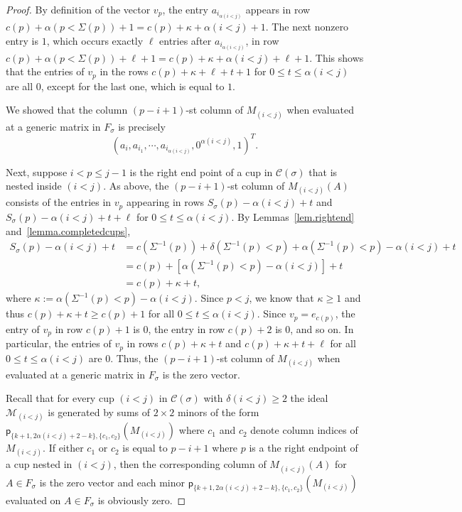 \documentclass[11pt]{amsart}
\theoremstyle{remark}
\theoremstyle{remark}
\theoremstyle{definition}
\theoremstyle{definition}
\theoremstyle{definition}
\numberwithin{equation}{section}
\newcommand{\ga}{\alpha}
\newcommand{\gd}{\delta}
\newcommand{\gs}{\sigma}
\newcommand{\cc}{\mathcal{C}}
\newcommand{\cm}{\mathcal{M}}
\newcommand{\al}{\alpha}
\newcommand{\pl}{\mathsf{p}}
\newcommand{\E}{\Sigma}
\newcommand{\cupsigma}{\cc(\gs)}
\newcommand{\cell}{F_\gs}
\begin{document}
\begin{proof}
By definition of the vector $v_p$, the entry $a_{i_{\ga(i<j)}}$ appears in row $c(p)+\alpha(p<\E(p))+1 = c(p)+\kappa+\ga(i<j)+1$. The next nonzero entry is $1$, which occurs exactly $\ell$ entries after $a_{i_{\ga(i<j)}}$, in row $c(p)+\alpha(p<\E(p))+\ell+1 = c(p)+\kappa+\ga(i<j)+\ell+1$.   This shows that the entries of $v_p$ in the rows $c(p)+\kappa + \ell +t +1$ for $0\leq t \leq \ga(i<j)$ are all $0$, except for the last one, which is equal to $1$. 
 

We showed that the column $(p-i+1)$-st column of $M_{(i<j)}$ when evaluated at a generic matrix in $\cell$ is precisely
\[
\left(a_{i},a_{i_1},\cdots,a_{i_{\al(i<j)}},0^{\ga(i<j)},1\right)^T.
\]


Next, suppose $i< p\leq j-1$ is the right end point of a cup in $\cupsigma$ that is nested inside $(i<j)$. As above, the $(p-i+1)$-st column of $M_{(i<j)}(A)$ consists of the entries in $v_p$ appearing in rows $S_\gs(p)-\ga(i<j)+t$ and $S_\gs(p)-\ga(i<j)+t+\ell$ for $0\leq t\leq\ga(i<j)$. By Lemmas~\ref{lem.rightend} and~\ref{lemma.completedcups}, 
\begin{align*}
S_\gs(p)-\ga(i<j)+t&= c(\E^{-1}(p))+\delta(\E^{-1}(p)<p) + \al(\E^{-1}(p)<p) - \al(i<j) +t \\
&=c(p)+\left[\ga(\E^{-1}(p)<p)-\ga(i<j)\right]+t  \\
&=c(p)+\kappa+t,
\end{align*}
where $\kappa:= \ga(\E^{-1}(p)<p)-\ga(i<j)$. Since $p<j$, we know that $\kappa\geq 1$ and thus $c(p)+\kappa + t \geq c(p)+1$ for all $0\leq t \leq \ga(i<j)$. Since $v_p = e_{c(p)}$, the entry of $v_p$ in row $c(p)+1$ is $0$, the entry in row $c(p)+2$ is $0$, and so on.  In particular, the entries of $v_p$ in rows $c(p)+\kappa+t$ and $c(p)+\kappa+t+\ell$ for all $0\leq t\leq \ga(i<j)$ are $0$. Thus, the $(p-i+1)$-st column of $M_{(i<j)} $ when evaluated at a generic matrix in $\cell$ is the zero vector.


Recall that for every cup $(i<j)$ in $\cupsigma$ with $\gd(i<j)\geq 2 $ the ideal $\cm_{(i<j)}$ is generated by sums of $2\times 2$ minors of the form $\pl_{\{k+1,2\ga(i<j)+2-k\},\{c_1,c_2\}} (M_{(i<j)})$ where $c_1$ and $c_2$ denote column indices of $M_{(i<j)}$. If either $c_1$ or $c_2$ is equal to $p-i+1$ where $p$ is a the right endpoint of a cup nested in $(i<j)$, then the corresponding column of $M_{(i<j)}(A)$ for $A\in \cell$ is the zero vector and each minor $\pl_{\{k+1,2\ga(i<j)+2-k\},\{c_1,c_2\}}(M_{(i<j)})$ evaluated on $A\in \cell$ is obviously zero. 


\end{proof}
\end{document}
